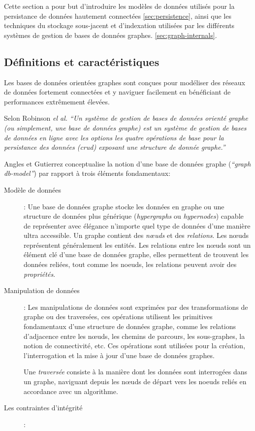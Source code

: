 Cette section a pour but d'introduire les modèles de données utilisés
pour la persistance de données hautement connectées
\ref{sec:persistence}, ainsi que les techniques du stockage
sous-jacent et d'indexation utilisées par les différents systèmes de
gestion de bases de données graphes.
\ref{sec:graph-internals}.\medskip

  \subsection{Définitions et caractéristiques}
  \label{sec:graphdb-defs}
  Les bases de données orientées graphes sont conçues pour modéliser
  des réseaux de données fortement connectées et y naviguer facilement
  en bénéficiant de performances extrêmement élevées.\medskip

  Selon Robinson \emph{el al.} \textit{``Un système de gestion de
    bases de données orienté graphe (ou simplement, une base de
    données graphe) est un système de gestion de bases de données en
    ligne avec les options les quatre opérations de base pour la
    persistance des données (\acrshort{crud}) exposant une structure
    de donnée graphe.''}\bigskip

  Angles et Gutierrez \cite{angles2008survey} conceptualise la notion
  d'une base de données graphe (\textit{``graph db-model''}) par
  rapport à trois éléments fondamentaux:\medskip

  \renewcommand{\descriptionlabel}[1]{\hspace{1cm}\textbullet~\textsf{#1}}
  \begin{description}
  \item [Modèle de données]: Une base de données graphe stocke les
    données en graphe ou une structure de données plus générique
    (\textit{hypergraphs} ou \textit{hypernodes}) capable de
    représenter avec élégance n'importe quel type de données d'une
    manière ultra accessible. Un graphe contient des \textit{nœuds} et
    des \textit{relations}. Les nœuds représentent généralement les
    entités. Les relations entre les nœuds sont un élément clé d'une
    base de données graphe, elles permettent de trouvent les données
    reliées, tout comme les noeuds, les relations peuvent avoir des
    \textit{propriétés}.

  \item [Manipulation de données]: Les manipulations de données sont
    exprimées par des transformations de graphe ou des traversées, ces
    opérations utilisent les primitives fondamentaux d'une structure
    de données graphe, comme les relations d'adjacence entre les
    nœuds, les chemins de parcours, les sous-graphes, la notion de
    connectivité, etc. Ces opérations sont utilisées pour la création,
    l'interrogation et la mise à jour d'une base de données
    graphes.\medskip

    Une \textit{traversée} consiste à la manière dont les données sont
    interrogées dans un graphe, naviguant depuis les nœuds de départ
    vers les noeuds reliés en accordance avec un algorithme.\bigskip

  \item [Les contraintes d'intégrité]:
  \end{description}
\enddescription
\newpage


